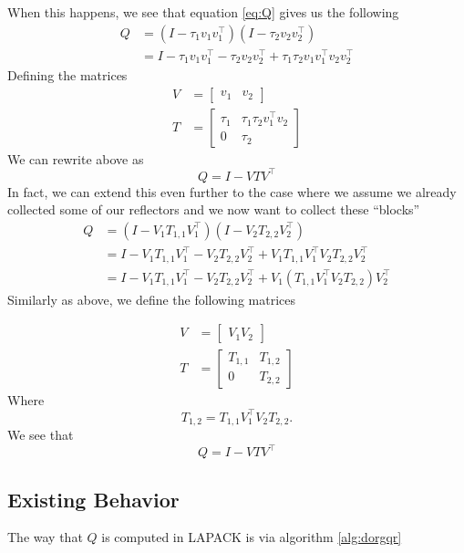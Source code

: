 \documentclass[12pt]{article}
\begin{document}
    When this happens, we see that equation \ref{eq:Q} gives us the following
    \begin{align*}
        Q &= \left(I-\tau_1v_1v_1^\top\right)\left(I-\tau_2v_2v_2^\top\right) \\
        &= I - \tau_1v_1v_1^\top - \tau_2v_2v_2^\top + \tau_1\tau_2v_1v_1^\top v_2v_2^\top
    \end{align*}
    Defining the matrices
    \begin{align*}
        V &= \begin{bmatrix} v_1 & v_2 \end{bmatrix} \\
        T &= \begin{bmatrix}
            \tau_1 & \tau_1\tau_2v_1^\top v_2 \\
            0      & \tau_2
        \end{bmatrix}
    \end{align*}
    We can rewrite above as 
    \[
        Q = I - VTV^\top
    \]
    In fact, we can extend this even further to the case where we assume we already collected some of our reflectors and we now want to collect these ``blocks''
    \begin{align*}
        Q &= \left(I - V_1T_{1,1}V_1^\top\right)\left(I - V_2T_{2,2}V_2^\top\right) \\
        &= I - V_1T_{1,1}V_1^\top - V_2T_{2,2}V_2^\top + V_1T_{1,1}V_1^\top V_2T_{2,2}V_2^\top \\
        &= I - V_1T_{1,1}V_1^\top - V_2T_{2,2}V_2^\top + V_1\left(T_{1,1}V_1^\top V_2T_{2,2}\right)V_2^\top 
    \end{align*}
    Similarly as above, we define the following matrices

    \begin{align*}
        V &= \begin{bmatrix} V_1 V_2 \end{bmatrix}\\
        T &= \begin{bmatrix} 
            T_{1,1} & T_{1,2} \\
            0       & T_{2,2}
        \end{bmatrix}
    \end{align*}
    Where 
    $$
    T_{1,2} = T_{1,1}V_1^\top V_2T_{2,2}.
    $$
    We see that 
    \[
        Q = I - VTV^\top
    \]
    \subsection{Existing Behavior}
    The way that $Q$ is computed in LAPACK is via algorithm \ref{alg:dorgqr}
\end{document}
